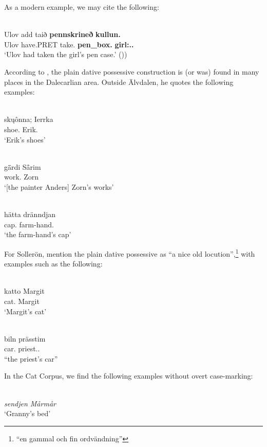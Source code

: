As a modern example, we may cite the following:

\ea\label{}
\\
\gll Ulov  add  taið  \textbf{pennskrineð} \textbf{kullun.}\\
Ulov  have.PRET  take.{\supp}  \textbf{pen\_box.{}} \textbf{girl:{\dat}.{\sg}.{}}\\
\glt ‘Ulov had taken the girl’s pen case.’ (\citet[120]{Åkerberg2012}))
\z

According to \citet[112]{Levander1928}, the plain dative possessive construction is (or was) found in many places in the Dalecarlian area. Outside Älvdalen, he quotes the following examples:

\ea\label{}
\\
\gll sk\k{u}ônna;  Ierrka\\
shoe.{\pl}  Erik.{\dat}\\
\glt ‘Erik’s shoes’
\z

\ea\label{}
\\
\gll g\={ä}rdi  S\={å}rim\\
work.{\pl}  Zorn\\
\glt ‘[the painter Anders] Zorn’s works’ 
\z

\ea\label{}
\\
\gll hätta  dränndjan\\
cap.{}  farm-hand.{\dat}\\
\glt ‘the farm-hand’s cap’
\z

For Sollerön, \citet[357]{AnderssonEtAl1999} mention the plain dative possessive as “a nice old locution”,\footnote{ “en gammal och fin ordvändning”} with examples such as the following:

\ea\label{}
\\
\gll katto  Margit\\
cat.{}  Margit\\
\glt ‘Margit’s cat’
\z

\ea\label{}
\\
\gll biln  prässtim\\
car.{}  priest.{}.{\dat}\\
\glt “the priest’s car”
\z

In the Cat Corpus, we find the following examples without overt case-marking:

\ea 
\ea 
{}\\
\gl \textit{sendjen Mårmår}\\
\glt ‘Granny’s bed’

